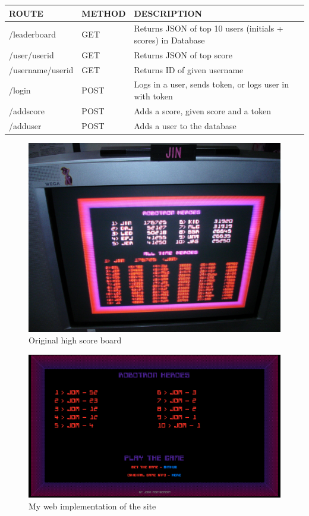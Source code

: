 \begin{table}[!ht]
\begin{tabular}{|l|l|l|}
\hline
\rowcolor[HTML]{C0C0C0} 
ROUTE            & METHOD & DESCRIPTION                                                  \\ \hline
/leaderboard     & GET    & Returns JSON of top 10 users (initials + scores) in Database \\ \hline
/user/userid     & GET    & Returns JSON of top score                                    \\ \hline
/username/userid & GET    & Returns ID of given username                                 \\ \hline
/login           & POST   & Logs in a user, sends token, or logs user in with token      \\ \hline
/addscore        & POST   & Adds a score, given score and a token                        \\ \hline
/adduser         & POST   & Adds a user to the database                                  \\ \hline
\end{tabular}
\end{table}


\begin{figure}[H]
  \includegraphics[width=0.8\linewidth]{Figures/web1.jpg}
  \centering
  \caption{Original high score board}
  \label{fig:web1}
\end{figure}


\begin{figure}[H]
  \includegraphics[width=0.8\linewidth]{Figures/web2.png}
  \centering
  \caption{My web implementation of the site}
  \label{fig:web2}
\end{figure}

